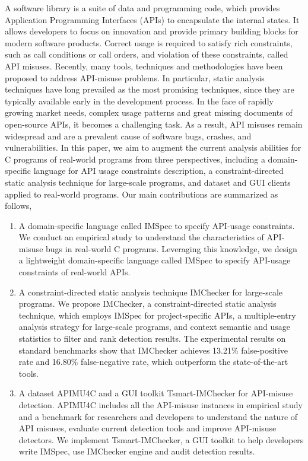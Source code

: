 \begin{eabstract}
   A software library is a suite of data and programming code, which provides Application Programming Interfaces (APIs) to encapsulate the internal states. 
   It allows developers to focus on innovation and provide primary building blocks for modern software products.
   Correct usage is required to satisfy rich constraints, such as call conditions or call orders, and violation of these constraints, called API misuses.
   Recently, many tools, techniques and methodologies have been proposed to address API-misuse problems. 
   In particular, static analysis techniques have long prevailed as the most promising techniques, since they are typically available early in the development process.
   In the face of rapidly growing market needs, complex usage patterns and great missing documents of open-source APIs, 
   it becomes a challenging task.
   As a result, API misuses remain widespread and are a prevalent cause of software bugs, crashes, and vulnerabilities.
   In this paper, we aim to augment the current analysis abilities for C programs of real-world programs from three perspectives, including a domain-specific language for API usage constraints description, 
   a constraint-directed static analysis technique for large-scale programs,
   and dataset and GUI clients applied to real-world programs.
   Our main contributions are summarized as follows,
   \begin{enumerate}
   	\item A domain-specific language called IMSpec to specify API-usage constraints.
   	We conduct an empirical study to understand the characteristics
   	of API-misuse bugs in real-world C programs.
   	Leveraging this knowledge, we design a lightweight domain-specific language called IMSpec to specify API-usage constraints of real-world APIs.
   	\item A constraint-directed static analysis technique IMChecker for large-scale programs.
   	We propose IMChecker, a constraint-directed static analysis technique, which employs IMSpec for project-specific APIs, a multiple-entry analysis strategy for large-scale programs, and context semantic and usage statistics to filter and rank detection results.
   	The experimental results on standard benchmarks show that IMChecker achieves 13.21\% false-positive rate and 16.80\% false-negative rate, 
   	which outperform the state-of-the-art tools.
   	\item A dataset APIMU4C and a GUI toolkit Tsmart-IMChecker for API-misuse detection.
   	APIMU4C includes all the API-misuse instances in empirical study and a benchmark for researchers and developers to understand the nature of API misuses, evaluate current detection tools and improve API-misuse detectors.
   	We implement Tsmart-IMChecker, a GUI toolkit to help developers write IMSpec, use IMChecker engine and audit detection results.
   \end{enumerate}


\end{eabstract}
